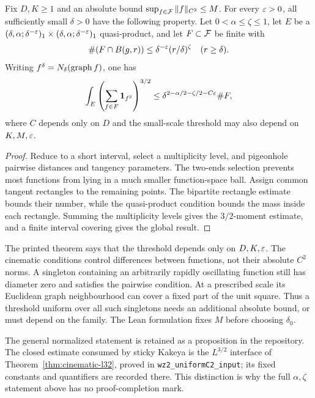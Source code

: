\begin{theorem}
\label{thm:pyz}
Fix $D,K\geq1$ and an absolute bound
$\sup_{f\in\mathcal{F}}\|f\|_{C^2}\leq M$. For every $\varepsilon>0$,
all sufficiently small $\delta>0$ have the following property.
Let $0<\alpha\leq\zeta\leq1$, let $E$ be a
$(\delta,\alpha;\delta^{-\varepsilon})_1\times
(\delta,\alpha;\delta^{-\varepsilon})_1$ quasi-product, and let
$F\subset\mathcal{F}$ be finite with
\[
           \#(F\cap B(g,r))\leq\delta^{-\varepsilon}(r/\delta)^\zeta
           \quad(r\geq\delta).
\]
Writing $f^\delta=N_\delta(\operatorname{graph} f)$, one has
\[
       \int_E\left(\sum_{f\in F}\mathbf{1}_{f^\delta}\right)^{3/2}
             \leq\delta^{2-\alpha/2-\zeta/2-C\varepsilon}\#F,
\]
where $C$ depends only on $D$ and the small-scale threshold may
also depend on $K,M,\varepsilon$.
\end{theorem}
\begin{proof}
Reduce to a short interval, select a multiplicity level, and
pigeonhole pairwise distances and tangency parameters. The
two-ends selection prevents most functions from lying in a much
smaller function-space ball. Assign common tangent rectangles to
the remaining points. The bipartite rectangle estimate bounds
their number, while the quasi-product condition bounds the mass
inside each rectangle. Summing the multiplicity levels gives the
$3/2$-moment estimate, and a finite interval covering gives the
global result.
\end{proof}

\begin{remark}
\label{rem:pyz-uniformity}
The printed theorem says that the threshold depends only on
$D,K,\varepsilon$. The cinematic conditions control differences between
functions, not their absolute $C^2$ norms. A singleton containing
an arbitrarily rapidly oscillating function still has diameter
zero and satisfies the pairwise condition. At a prescribed scale
its Euclidean graph neighbourhood can cover a fixed part of the
unit square. Thus a threshold uniform over all such singletons
needs an additional absolute bound, or must depend on the family.
The Lean formulation fixes $M$ before choosing $\delta_0$.

The general normalized statement is retained as a proposition in
the repository. The closed estimate consumed by sticky Kakeya is
the $L^{3/2}$ interface of Theorem~\ref{thm:cinematic-l32}, proved
in \texttt{wz2\_uniformC2\_input}; its fixed constants and
quantifiers are recorded there. This distinction is why the full
$\alpha,\zeta$ statement above has no proof-completion mark.
\end{remark}

